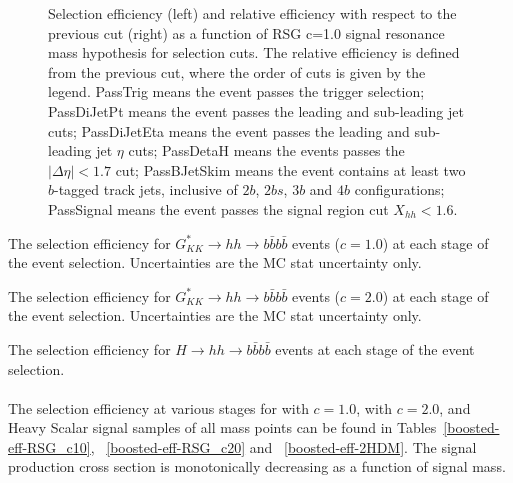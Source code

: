 \begin{figure}[htbp!]
  \caption{Selection efficiency (left) and relative efficiency with respect to the previous cut (right) as a function of RSG c=1.0 signal resonance mass hypothesis for selection cuts. The relative efficiency is defined from the previous cut, where the order of cuts is given by the legend. PassTrig means the event passes the trigger selection; PassDiJetPt means the event passes the leading and sub-leading jet \pt cuts; PassDiJetEta means the event passes the leading and sub-leading jet $\eta$ cuts; PassDetaH means the events passes the $|\Delta \eta| < 1.7$ cut; PassBJetSkim means the event contains at least two $b$-tagged track jets, inclusive of $2b$, $2bs$, $3b$ and $4b$ configurations; PassSignal means the event passes the signal region cut $X_{hh} < 1.6$.}
  \label{fig:boosted-selection-efficiency}
\end{figure}


\begin{table}[htb!]
\scriptsize
\caption{The selection efficiency for $G_{KK}^{*}\rightarrow hh\rightarrow b\bar{b}b\bar{b}$ events ($c=1.0$) at each stage of the event selection. Uncertainties are the MC stat uncertainty only.}
\begin{center}
\resizebox{\textwidth}{!}{

}
\end{center}
\label{boosted-eff-RSG_c10}
\end{table}

\begin{table}[htb!]
\scriptsize
\caption{The selection efficiency for $G_{KK}^{*}\rightarrow hh\rightarrow b\bar{b}b\bar{b}$ events ($c=2.0$) at each stage of the event selection. Uncertainties are the MC stat uncertainty only.}
\begin{center}
\resizebox{\textwidth}{!}{

}
\end{center}
\label{boosted-eff-RSG_c20}
\end{table}

\begin{table}[htb!]
\scriptsize
\caption{The selection efficiency for $H\rightarrow hh\rightarrow b\bar{b}b\bar{b}$ events at each stage of the event selection.}
\begin{center}
\resizebox{\textwidth}{!}{

}
\end{center}
\label{boosted-eff-2HDM}
\end{table}


\paragraph{}
The selection efficiency at various stages for \Grav with $c=1.0$, \Grav with $c=2.0$, and Heavy Scalar signal samples of all mass points can be found in Tables~\ref{boosted-eff-RSG_c10}, ~\ref{boosted-eff-RSG_c20} and ~\ref{boosted-eff-2HDM}.
The signal production cross section is monotonically decreasing as a function of signal mass.


